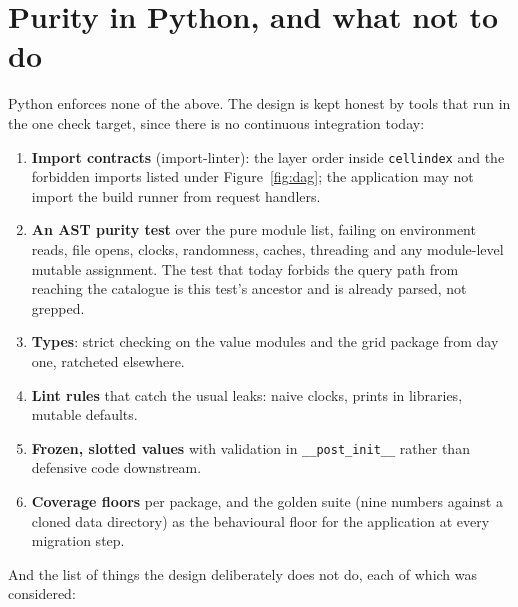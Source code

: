 \documentclass[10pt,a4paper]{article}
\newcommand{\code}[1]{\texttt{#1}}
\begin{document}
\section{Purity in Python, and what not to do}
\label{ch:discipline}

Python enforces none of the above. The design is kept honest by tools that run in the one check target, since
there is no continuous integration today:

\begin{enumerate}
\item \textbf{Import contracts} (import-linter): the layer order inside \code{cellindex} and the forbidden
  imports listed under Figure~\ref{fig:dag}; the application may not import the build runner from request
  handlers.
\item \textbf{An AST purity test} over the pure module list, failing on environment reads, file opens, clocks,
  randomness, caches, threading and any module-level mutable assignment. The test that today forbids the query
  path from reaching the catalogue is this test's ancestor and is already parsed, not grepped.
\item \textbf{Types}: strict checking on the value modules and the grid package from day one, ratcheted elsewhere.
\item \textbf{Lint rules} that catch the usual leaks: naive clocks, prints in libraries, mutable defaults.
\item \textbf{Frozen, slotted values} with validation in \code{\_\_post\_init\_\_} rather than defensive code
  downstream.
\item \textbf{Coverage floors} per package, and the golden suite (nine numbers against a cloned data directory) as
  the behavioural floor for the application at every migration step.
\end{enumerate}

And the list of things the design deliberately does not do, each of which was considered:
\end{document}
